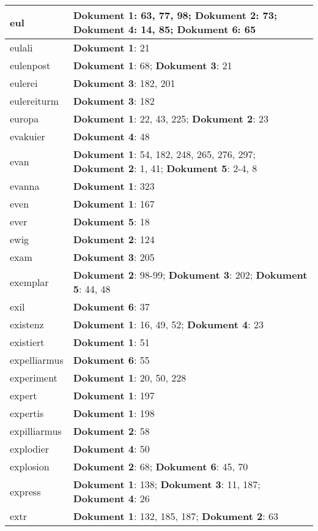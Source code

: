 \documentclass[a5paper]{article}
\begin{document}
\begin{longtable}[l]{|l|p{3in}|}
\hline
eul & \textbf{Dokument 1}: 63, 77, 98; \textbf{Dokument 2}: 73; \textbf{Dokument 4}: 14, 85; \textbf{Dokument 6}: 65 \\
\hline
eulali & \textbf{Dokument 1}: 21 \\
\hline
eulenpost & \textbf{Dokument 1}: 68; \textbf{Dokument 3}: 21 \\
\hline
eulerei & \textbf{Dokument 3}: 182, 201 \\
\hline
eulereiturm & \textbf{Dokument 3}: 182 \\
\hline
europa & \textbf{Dokument 1}: 22, 43, 225; \textbf{Dokument 2}: 23 \\
\hline
evakuier & \textbf{Dokument 4}: 48 \\
\hline
evan & \textbf{Dokument 1}: 54, 182, 248, 265, 276, 297; \textbf{Dokument 2}: 1, 41; \textbf{Dokument 5}: 2-4, 8 \\
\hline
evanna & \textbf{Dokument 1}: 323 \\
\hline
even & \textbf{Dokument 1}: 167 \\
\hline
ever & \textbf{Dokument 5}: 18 \\
\hline
ewig & \textbf{Dokument 2}: 124 \\
\hline
exam & \textbf{Dokument 3}: 205 \\
\hline
exemplar & \textbf{Dokument 2}: 98-99; \textbf{Dokument 3}: 202; \textbf{Dokument 5}: 44, 48 \\
\hline
exil & \textbf{Dokument 6}: 37 \\
\hline
existenz & \textbf{Dokument 1}: 16, 49, 52; \textbf{Dokument 4}: 23 \\
\hline
existiert & \textbf{Dokument 1}: 51 \\
\hline
expelliarmus & \textbf{Dokument 6}: 55 \\
\hline
experiment & \textbf{Dokument 1}: 20, 50, 228 \\
\hline
expert & \textbf{Dokument 1}: 197 \\
\hline
expertis & \textbf{Dokument 1}: 198 \\
\hline
expilliarmus & \textbf{Dokument 2}: 58 \\
\hline
explodier & \textbf{Dokument 4}: 50 \\
\hline
explosion & \textbf{Dokument 2}: 68; \textbf{Dokument 6}: 45, 70 \\
\hline
express & \textbf{Dokument 1}: 138; \textbf{Dokument 3}: 11, 187; \textbf{Dokument 4}: 26 \\
\hline
extr & \textbf{Dokument 1}: 132, 185, 187; \textbf{Dokument 2}: 63 \\

\end{longtable}
\end{document}
